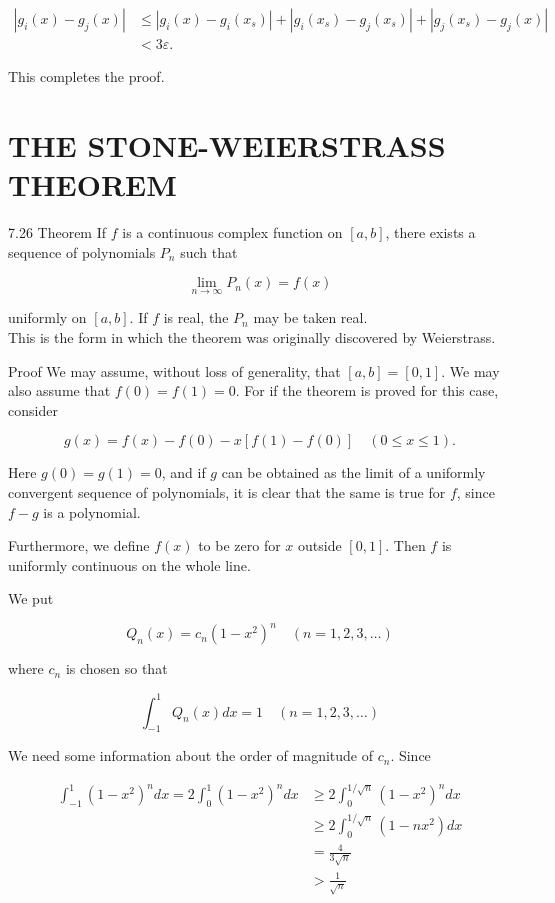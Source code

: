 \documentclass[10pt]{article}
\begin{document}
$$
\begin{aligned}
\left|g_{i}(x)-g_{j}(x)\right| & \leq\left|g_{i}(x)-g_{i}\left(x_{s}\right)\right|+\left|g_{i}\left(x_{s}\right)-g_{j}\left(x_{s}\right)\right|+\left|g_{j}\left(x_{s}\right)-g_{j}(x)\right| \\
& <3 \varepsilon .
\end{aligned}
$$

This completes the proof.

\section*{THE STONE-WEIERSTRASS THEOREM}
7.26 Theorem If $f$ is a continuous complex function on $[a, b]$, there exists a sequence of polynomials $P_{n}$ such that

$$
\lim _{n \rightarrow \infty} P_{n}(x)=f(x)
$$

uniformly on $[a, b]$. If $f$ is real, the $P_{n}$ may be taken real.\\
This is the form in which the theorem was originally discovered by Weierstrass.

Proof We may assume, without loss of generality, that $[a, b]=[0,1]$. We may also assume that $f(0)=f(1)=0$. For if the theorem is proved for this case, consider

$$
g(x)=f(x)-f(0)-x[f(1)-f(0)] \quad(0 \leq x \leq 1) .
$$

Here $g(0)=g(1)=0$, and if $g$ can be obtained as the limit of a uniformly convergent sequence of polynomials, it is clear that the same is true for $f$, since $f-g$ is a polynomial.

Furthermore, we define $f(x)$ to be zero for $x$ outside $[0,1]$. Then $f$ is uniformly continuous on the whole line.

We put


\begin{equation*}
Q_{n}(x)=c_{n}\left(1-x^{2}\right)^{n} \quad(n=1,2,3, \ldots) \tag{47}
\end{equation*}


where $c_{n}$ is chosen so that


\begin{equation*}
\int_{-1}^{1} Q_{n}(x) d x=1 \quad(n=1,2,3, \ldots) \tag{48}
\end{equation*}


We need some information about the order of magnitude of $c_{n}$. Since

$$
\begin{aligned}
\int_{-1}^{1}\left(1-x^{2}\right)^{n} d x=2 \int_{0}^{1}\left(1-x^{2}\right)^{n} d x & \geq 2 \int_{0}^{1 / \sqrt{n}}\left(1-x^{2}\right)^{n} d x \\
& \geq 2 \int_{0}^{1 / \sqrt{n}}\left(1-n x^{2}\right) d x \\
& =\frac{4}{3 \sqrt{n}} \\
& >\frac{1}{\sqrt{n}}
\end{aligned}
$$
\end{document}
